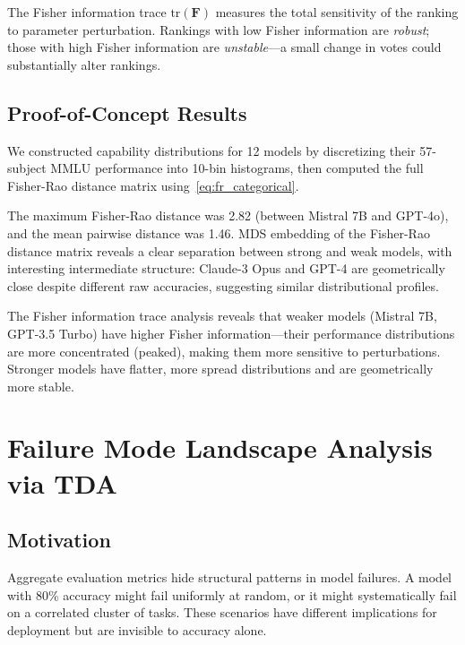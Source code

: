 \documentclass[11pt]{article}
\newcommand{\Fish}{\mathbf{F}}
\begin{document}
The Fisher information trace $\mathrm{tr}(\Fish)$ measures the total sensitivity of the ranking to parameter perturbation. Rankings with low Fisher information are \emph{robust}; those with high Fisher information are \emph{unstable}---a small change in votes could substantially alter rankings.

\subsection{Proof-of-Concept Results}

We constructed capability distributions for 12 models by discretizing their 57-subject MMLU performance into 10-bin histograms, then computed the full Fisher-Rao distance matrix using~\eqref{eq:fr_categorical}.

The maximum Fisher-Rao distance was 2.82 (between Mistral 7B and GPT-4o), and the mean pairwise distance was 1.46. MDS embedding of the Fisher-Rao distance matrix reveals a clear separation between strong and weak models, with interesting intermediate structure: Claude-3 Opus and GPT-4 are geometrically close despite different raw accuracies, suggesting similar distributional profiles.

The Fisher information trace analysis reveals that weaker models (Mistral 7B, GPT-3.5 Turbo) have higher Fisher information---their performance distributions are more concentrated (peaked), making them more sensitive to perturbations. Stronger models have flatter, more spread distributions and are geometrically more stable.

\section{Failure Mode Landscape Analysis via TDA}
\label{sec:failure}

\subsection{Motivation}

Aggregate evaluation metrics hide structural patterns in model failures. A model with 80\% accuracy might fail uniformly at random, or it might systematically fail on a correlated cluster of tasks. These scenarios have different implications for deployment but are invisible to accuracy alone.
\end{document}
